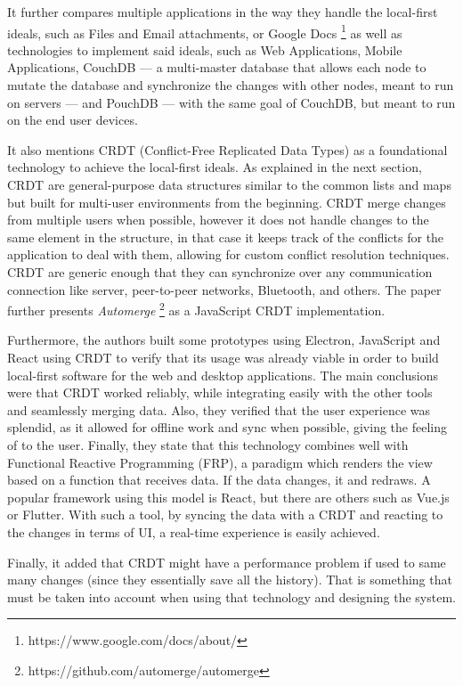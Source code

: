 It further compares multiple applications in the way they handle the local-first ideals, such as Files and Email attachments, or Google Docs \footnote{https://www.google.com/docs/about/} as well as technologies to implement said ideals, such as Web Applications, Mobile Applications, CouchDB \cite{couchdb} --- a multi-master database that allows each node to mutate the database and synchronize the changes with other nodes, meant to run on servers --- and PouchDB \cite{pouchdb} --- with the same goal of CouchDB, but meant to run on the end user devices.

It also mentions CRDT (Conflict-Free Replicated Data Types) as a foundational technology to achieve the local-first ideals. As explained in the next section,  CRDT are general-purpose data structures similar to the common lists and maps but built for multi-user environments from the beginning. CRDT merge changes from multiple users when possible, however it does not handle changes to the same element in the structure, in that case it keeps track of the conflicts for the application to deal with them, allowing for custom conflict resolution techniques. CRDT are generic enough that they can synchronize over any communication connection like server, peer-to-peer networks, Bluetooth, and others. The paper further presents \textit{Automerge} \footnote{https://github.com/automerge/automerge} as a JavaScript CRDT implementation.

Furthermore, the authors built some prototypes using Electron, JavaScript and React using CRDT to verify that its usage was already viable in order to build local-first software for the web and desktop applications. The main conclusions were that CRDT worked reliably, while integrating easily with the other tools and seamlessly merging data. Also, they verified that the user experience was splendid, as it allowed for offline work and sync when possible, giving the feeling of  to the user. Finally, they state that this technology combines well with Functional Reactive Programming (FRP), a paradigm which renders the view based on a function that receives data. If the data changes, it  and redraws. A popular framework using this model is React, but there are others such as Vue.js or Flutter. With such a tool, by syncing the data with a CRDT and reacting to the changes in terms of UI, a real-time experience is easily achieved.

Finally, it added that CRDT might have a performance problem if used to same many changes (since they essentially save all the history). That is something that must be taken into account when using that technology and designing the system.

